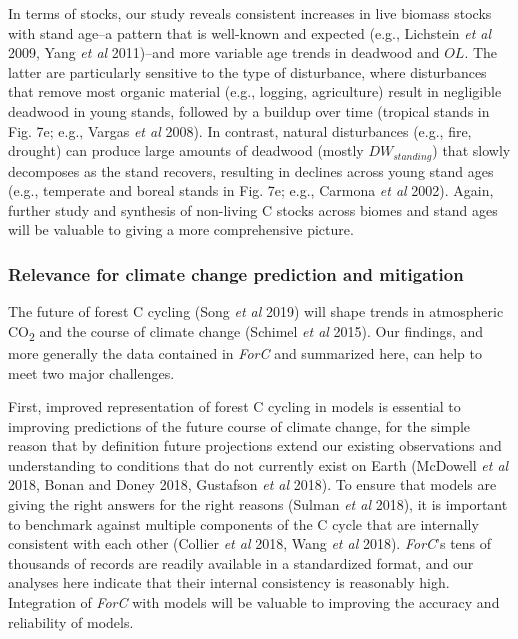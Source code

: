 \documentclass[
]{article}
\begin{document}
In terms of stocks, our study reveals consistent increases in live
biomass stocks with stand age--a pattern that is well-known and expected
(e.g., Lichstein \emph{et al} 2009, Yang \emph{et al} 2011)--and more
variable age trends in deadwood and \(OL\). The latter are particularly
sensitive to the type of disturbance, where disturbances that remove
most organic material (e.g., logging, agriculture) result in negligible
deadwood in young stands, followed by a buildup over time (tropical
stands in Fig. 7e; e.g., Vargas \emph{et al} 2008). In contrast, natural
disturbances (e.g., fire, drought) can produce large amounts of deadwood
(mostly \(DW_{standing}\)) that slowly decomposes as the stand recovers,
resulting in declines across young stand ages (e.g., temperate and
boreal stands in Fig. 7e; e.g., Carmona \emph{et al} 2002). Again,
further study and synthesis of non-living C stocks across biomes and
stand ages will be valuable to giving a more comprehensive picture.

\hypertarget{relevance-for-climate-change-prediction-and-mitigation}{%
\subsubsection{Relevance for climate change prediction and
mitigation}\label{relevance-for-climate-change-prediction-and-mitigation}}

The future of forest C cycling (Song \emph{et al} 2019) will shape
trends in atmospheric CO\textsubscript{2} and the course of climate
change (Schimel \emph{et al} 2015). Our findings, and more generally the
data contained in \emph{ForC} and summarized here, can help to meet two
major challenges.

First, improved representation of forest C cycling in models is
essential to improving predictions of the future course of climate
change, for the simple reason that by definition future projections
extend our existing observations and understanding to conditions that do
not currently exist on Earth (McDowell \emph{et al} 2018, Bonan and
Doney 2018, Gustafson \emph{et al} 2018). To ensure that models are
giving the right answers for the right reasons (Sulman \emph{et al}
2018), it is important to benchmark against multiple components of the C
cycle that are internally consistent with each other (Collier \emph{et
al} 2018, Wang \emph{et al} 2018). \emph{ForC}'s tens of thousands of
records are readily available in a standardized format, and our analyses
here indicate that their internal consistency is reasonably high.
Integration of \emph{ForC} with models will be valuable to improving the
accuracy and reliability of models.
\end{document}
